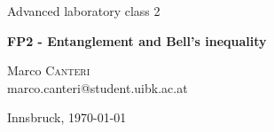 \documentclass[a4paper,10pt]{article}
\begin{document}
\begin{titlepage}
 \begin{center}
	\Large{Advanced laboratory class 2}
	\end{center}
	\begin{center}
	 \LARGE{\textbf{FP2 - Entanglement and Bell’s inequality}}
	\end{center}
	
	\begin{center}
	
	\large Marco \textsc{Canteri} \\
	marco.canteri@student.uibk.ac.at
	\end{center}
	
	\begin{center}
	\vspace{1cm}
	Innsbruck, \today
	\vspace{2cm}
	\end{center}
	

\end{titlepage}
\end{document}
